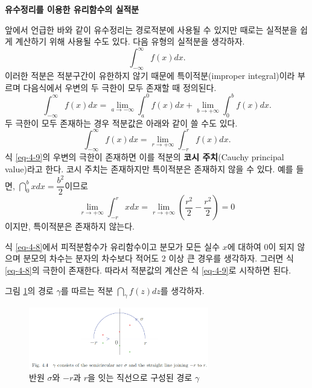 {\bf 유수정리를 이용한 유리함수의 실적분}

앞에서 언급한 바와 같이
유수정리는 경로적분에 사용될 수 있지만
때로는 실적분을 쉽게 계산하기 위해 사용될 수도 있다.
다음 유형의 실적분을 생각하자.
\[
\int_{-\infty}^\infty f(x)dx.
\]
이러한 적분은
적분구간이 유한하지 않기 때문에 특이적분(improper integral)이라 부르며
다음식에서 우변의 두 극한이 모두 존재할 때 정의된다.
\begin{equation}\label{eq-4-8}
\int_{-\infty}^\infty f(x)dx = \lim_{a\to-\infty} \int_a^0 f(x) dx
+ \lim_{b\to+\infty} \int_0^b f(x)dx.
\end{equation}
두 극한이 모두 존재하는 경우 적분값은 아래와 같이 쓸 수도 있다.
\begin{equation} \label{eq-4-9}
\int_{-\infty}^\infty f(x)dx = \lim_{r\to+\infty} \int_{-r}^r f(x) dx.
\end{equation}
식 \eqref{eq-4-9}의 우변의 극한이 존재하면 
이를 적분의 {\bf 코시 주치}(Cauchy principal value)라고 한다.
코시 주치는 존재하지만 특이적분은 존재하지 않을 수 있다.
예를 들면, $\dint_0^b xdx = \dfrac{b^2}2$이므로
\[
\lim_{r\to+\infty} \int_{-r}^r x dx = 
\lim_{r\to+\infty} \left( \dfrac{r^2}2 - \dfrac{r^2}2 \right) = 0
\]
이지만, 특이적분은 존재하지 않는다.

식 \eqref{eq-4-8}에서 피적분함수가 유리함수이고
분모가 모든 실수 $x$에 대하여 $0$이 되지 않으며
분모의 차수는 분자의 차수보다 적어도 $2$ 이상 큰 경우를 생각하자.
그러면 식 \eqref{eq-4-8}의 극한이 존재한다. 따라서
적분값의 계산은 식 \eqref{eq-4-9}로 시작하면 된다.

그림 \ref{fig-4-4}의 경로 $\gamma$를 따르는 적분
$\dint_\gamma f(z)dz$를 생각하자.

\begin{figure}[h!]
\begin{center}
\includegraphics[width=0.7\textwidth]{./SaltChapter/fig-4-4}
\end{center}
\caption{반원 $\sigma$와 $-r$과 $r$을 잇는 직선으로 구성된 경로 $\gamma$}
\label{fig-4-4}
\end{figure}

